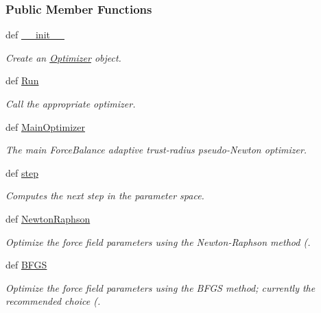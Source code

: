 \subsubsection*{Public Member Functions}
\begin{DoxyCompactItemize}
\item 
def \hyperlink{classforcebalance_1_1optimizer_1_1Optimizer_a674f1c17cbfaffa7955fb5d833d33e0b}{\-\_\-\-\_\-init\-\_\-\-\_\-}
\begin{DoxyCompactList}\small\item\em Create an \hyperlink{classforcebalance_1_1optimizer_1_1Optimizer}{Optimizer} object. \end{DoxyCompactList}\item 
def \hyperlink{classforcebalance_1_1optimizer_1_1Optimizer_a85688c895ce936fa4368d9e2f7fcb4b5}{Run}
\begin{DoxyCompactList}\small\item\em Call the appropriate optimizer. \end{DoxyCompactList}\item 
def \hyperlink{classforcebalance_1_1optimizer_1_1Optimizer_a1d222f82239075ea0d6b9294b2f50e12}{Main\-Optimizer}
\begin{DoxyCompactList}\small\item\em The main Force\-Balance adaptive trust-\/radius pseudo-\/\-Newton optimizer. \end{DoxyCompactList}\item 
def \hyperlink{classforcebalance_1_1optimizer_1_1Optimizer_aacc231ff56f5d87597a95f4e543360a2}{step}
\begin{DoxyCompactList}\small\item\em Computes the next step in the parameter space. \end{DoxyCompactList}\item 
def \hyperlink{classforcebalance_1_1optimizer_1_1Optimizer_a5b6e95f9f49b7d970ac8441d68a0023f}{Newton\-Raphson}
\begin{DoxyCompactList}\small\item\em Optimize the force field parameters using the Newton-\/\-Raphson method (. \end{DoxyCompactList}\item 
def \hyperlink{classforcebalance_1_1optimizer_1_1Optimizer_a58b957fe289822934711c29dfeb8d203}{B\-F\-G\-S}
\begin{DoxyCompactList}\small\item\em Optimize the force field parameters using the B\-F\-G\-S method; currently the recommended choice (. \end{DoxyCompactList}\item 

\end{DoxyCompactItemize}

